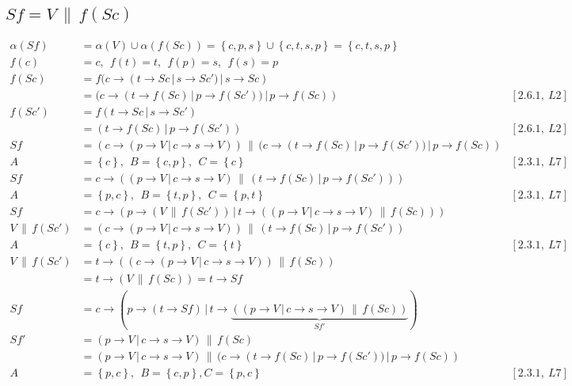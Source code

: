 \documentclass[11pt,a4paper]{article}
\def\ra{\rightarrow}
\def\cc{\,\|\,}
\def\ch{\,|\,}
\newcommand{\sN}[1]{\left \lbrace #1 \right \rbrace}
\begin{document}
\subsection{$Sf = V \cc f(Sc)$}

\begin{align*}
    \alpha(Sf) &= \alpha(V) \cup \alpha(f(Sc)) = \sN{c,p,s} \cup \sN{c,t,s,p} =
    \sN{c,t,s,p} & \\
    f(c) &= c,~~  f(t) = t,~~ f(p) = s,~~ f(s) = p & \\
    f(Sc) &= f(c \ra (t \ra Sc \ch s \ra Sc') \ch s \ra  Sc) & \\
          &= (c \ra (t \ra f(Sc) \ch p \ra f(Sc')) \ch p \ra f(Sc)) & [2.6.1,~L2] \\
    f(Sc') &= f(t \ra Sc \ch s \ra Sc') & \\
           &= (t \ra f(Sc) \ch p \ra f(Sc')) & [2.6.1,~L2] \\
    Sf &= (c \ra (p \ra V \ch c \ra s \ra V)) \cc
            (c \ra (t \ra f(Sc) \ch p \ra f(Sc')) \ch p \ra f(Sc)) & \\
     A &= \sN{c},~~ B = \sN{c,p},~~ C = \sN{c} & [2.3.1,~L7] \\
    Sf &= c \ra ((p \ra V \ch c \ra s \ra V) \cc
                  (t \ra f(Sc) \ch p \ra f(Sc'))) & \\
     A &= \sN{p,c},~~ B = \sN{t,p},~~ C = \sN{p,t} & [2.3.1,~L7] \\
    Sf &= c \ra (p \ra (V \cc f(Sc'))
             \ch t \ra ( (p \ra V \ch c \ra s \ra V) \cc f(Sc)) ) & \\
    V \cc f(Sc') &= (c \ra (p \ra V \ch c \ra s \ra V))
                \cc (t \ra f(Sc) \ch p \ra f(Sc')) & \\
     A &= \sN{c},~~ B = \sN{t,p},~~ C = \sN{t} & [2.3.1,~L7] \\
    V \cc f(Sc') &= t \ra ((c \ra (p \ra V \ch c \ra s \ra V)) \cc f(Sc)) & \\
                 &= t \ra (V \cc f(Sc)) = t \ra Sf & \\
    Sf &= c \ra (p \ra (t \ra Sf)
    \ch t \ra \underbrace{( (p \ra V \ch c \ra s \ra V) \cc f(Sc))}_{Sf'} ) & \\
    Sf'   &= (p \ra V \ch c \ra s \ra V) \cc f(Sc) & \\
          &= (p \ra V \ch c \ra s \ra V) \cc
             (c \ra (t \ra f(Sc) \ch p \ra f(Sc')) \ch p \ra f(Sc)) & \\
        A &= \sN{p,c},~~ B = \sN{c,p}, C = \sN{p,c} & [2.3.1,~L7] \\

\end{align*}
\end{document}
